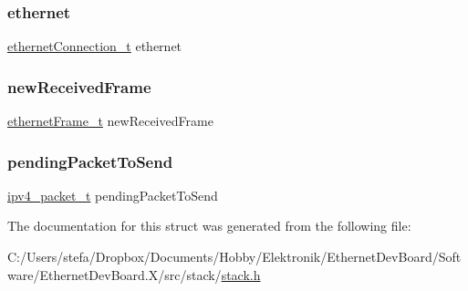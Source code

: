 \mbox{\label{structstack_ad531e518750e328d180181dad48b5a47}} 
\subsubsection{\texorpdfstring{ethernet}{ethernet}}
{\footnotesize\ttfamily \mbox{\hyperlink{group__ethernet_gae7b6008a02816680c2e3a1e3d2451a60}{ethernet\+Connection\+\_\+t}} ethernet}

\mbox{\label{structstack_adb9d89701c6708cac78a4c6373c307e6}} 
\subsubsection{\texorpdfstring{newReceivedFrame}{newReceivedFrame}}
{\footnotesize\ttfamily \mbox{\hyperlink{group__ethernet_ga7519a7ae14b490659069435698d28a25}{ethernet\+Frame\+\_\+t}} new\+Received\+Frame}

\mbox{\label{structstack_add38392b782a601d965c4f3cdca4617f}} 
\subsubsection{\texorpdfstring{pendingPacketToSend}{pendingPacketToSend}}
{\footnotesize\ttfamily \mbox{\hyperlink{group__ipv4_ga68ea36d252d9332fd5e37d9aaedd06af}{ipv4\+\_\+packet\+\_\+t}} pending\+Packet\+To\+Send}



The documentation for this struct was generated from the following file\+:\begin{DoxyCompactItemize}
\item 
C\+:/\+Users/stefa/\+Dropbox/\+Documents/\+Hobby/\+Elektronik/\+Ethernet\+Dev\+Board/\+Software/\+Ethernet\+Dev\+Board.\+X/src/stack/\mbox{\hyperlink{stack_8h}{stack.\+h}}\end{DoxyCompactItemize}
